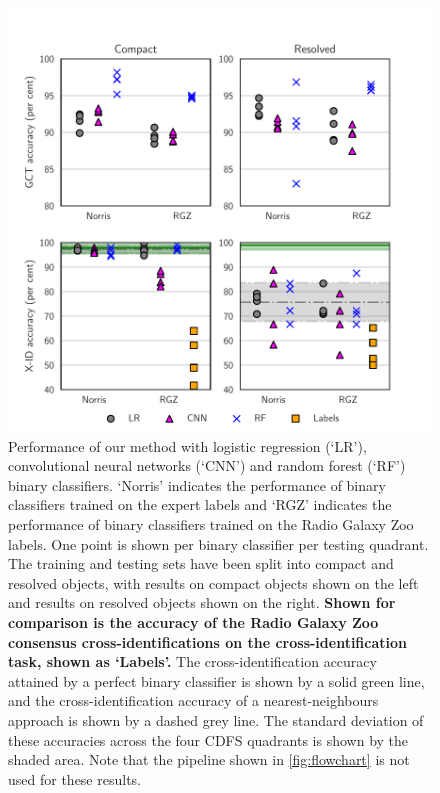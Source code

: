 \documentclass[fleqn,usenatbib,usedcolumn]{mnras}
\newcommand{\edited}[1]{{\bf {#1}}}
\begin{document}
    \begin{figure}
    \centering
    \includegraphics[width=\columnwidth]{images/cdfs-grid-new.pdf}
    \caption{Performance of our method with logistic regression (`LR'), convolutional neural networks (`CNN') and random forest (`RF') binary classifiers. `Norris' indicates the performance of binary classifiers trained on the expert labels and `RGZ' indicates the performance of binary classifiers trained on the Radio Galaxy Zoo labels. One point is shown per binary classifier per testing quadrant. The training and testing sets have been split into compact and resolved objects, with results on compact objects shown on the left and results on resolved objects shown on the right. \edited{Shown for comparison is the accuracy of the Radio Galaxy Zoo consensus cross-identifications on the cross-identification task, shown as `Labels'.} The cross-identification accuracy attained by a perfect binary classifier is shown by a solid green line, and the cross-identification accuracy of a nearest-neighbours approach is shown by a dashed grey line. The standard deviation of these accuracies across the four CDFS quadrants is shown by the shaded area. Note that the pipeline shown in \autoref{fig:flowchart} is not used for these results. \label{fig:ba}}
    \end{figure}
\end{document}
